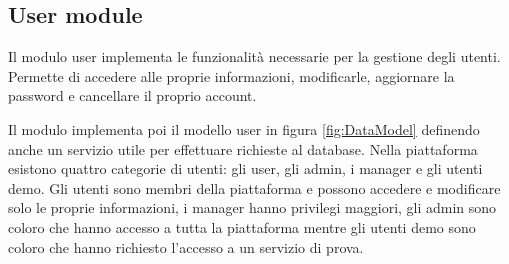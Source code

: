 \subsection{User module}
Il modulo user implementa le funzionalità necessarie per la gestione degli utenti.
Permette di accedere alle proprie informazioni, modificarle, aggiornare la password e cancellare il proprio account.

Il modulo implementa poi il modello user in figura \ref{fig:DataModel} definendo anche un servizio utile per
effettuare richieste al database.
Nella piattaforma esistono quattro categorie di utenti: gli user, gli admin, i manager e gli utenti demo.
Gli utenti sono membri della piattaforma e possono accedere e modificare solo le proprie informazioni,
i manager hanno privilegi maggiori, gli admin sono coloro che hanno accesso a tutta la piattaforma mentre gli utenti demo
sono coloro che hanno richiesto l'accesso a un servizio di prova.

